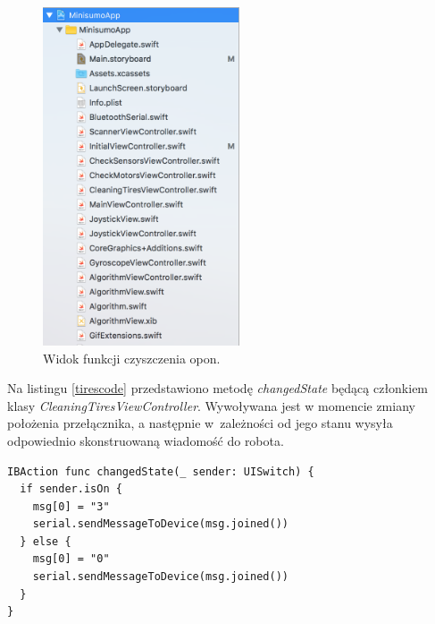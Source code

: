 \begin{figure}[H]
	\centering
		\includegraphics[width=0.75\linewidth, height=10cm, keepaspectratio]{pic05/structure.png}
	\caption{Widok funkcji czyszczenia opon.}
	\label{fig:tires}	
\end{figure}

Na listingu \ref{tirescode} przedstawiono metodę \textit{changedState} będącą członkiem klasy \textit{CleaningTiresViewController}. Wywoływana jest w momencie zmiany położenia przełącznika, a następnie w~zależności od jego stanu wysyła odpowiednio skonstruowaną wiadomość do robota.  

\begin{minipage}{\textwidth}
	\begin{lstlisting}[label=tirescode,caption=Nasłuchiwanie zmiany położenia przełącznika.]
IBAction func changedState(_ sender: UISwitch) {
  if sender.isOn {
    msg[0] = "3"
    serial.sendMessageToDevice(msg.joined())
  } else {
    msg[0] = "0"
    serial.sendMessageToDevice(msg.joined())
  }
}
	\end{lstlisting}
\end{minipage}

